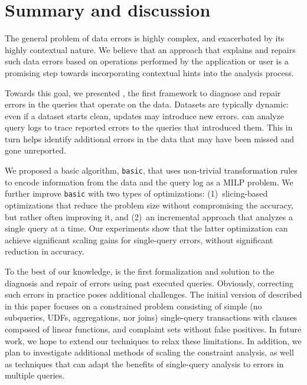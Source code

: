 
\section{Summary and discussion}

The general problem of data errors is highly complex, and exacerbated by its highly contextual nature.
We believe that an approach that explains and repairs such data errors based on operations performed by the application or user
is a promising step towards incorporating contextual hints into the analysis process.

Towards this goal, we presented \sys, the first framework to diagnose and
repair errors in the queries that operate on the data.
Datasets are typically dynamic: even if a dataset starts clean,
updates may introduce new errors. \sys can
analyze query logs to trace reported errors to the queries that
introduced them. This in turn helps identify additional errors
in the data that may have been missed and gone unreported.

We proposed a basic algorithm, \texttt{basic}, that uses non-trivial transformation rules to
encode information from the data and the query log as a MILP problem. We further improve 
\texttt{basic} with two types of optimizations: 
(1)~slicing-based optimizations that reduce the problem
size without compromising the accuracy, but rather often improving it, and 
(2)~an incremental approach that analyzes a single query at a time. 
Our experiments show that the latter
optimization can achieve significant scaling gains for single-query
errors, without significant reduction in accuracy.

To the best of our knowledge, \sys is the first formalization and solution to the diagnosis
and repair of errors using past executed queries. 
Obviously, correcting such errors in practice poses additional challenges. 
The initial version of \sys described in this paper focuses on a constrained problem consisting of
simple (no subqueries, UDFs, aggregations, nor joins)
single-query transactions with clauses composed of linear functions, and
complaint sets without false positives.
In future work, we hope to extend our techniques to relax these limitations.
In addition, we plan to investigate additional methods of scaling the constraint analysis, 
as well as techniques that can adapt the benefits of single-query analysis to errors in multiple queries.



